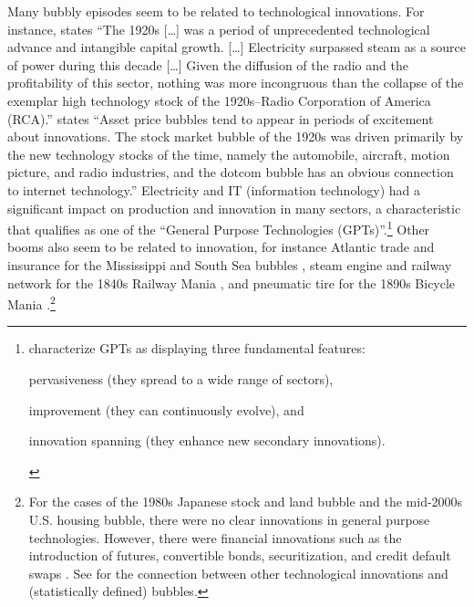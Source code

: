 \documentclass[a4paper,12pt]{article}
\numberwithin{equation}{section}
\theoremstyle{plain}
\begin{document}
Many bubbly episodes seem to be related to technological innovations. For instance, \citet[p.~1372]{Nicholas2008} states ``The 1920s [\ldots] was a period of unprecedented technological advance and intangible capital growth. [\ldots] Electricity
surpassed steam as a source of power during this decade [\ldots] Given the diffusion of the radio and the profitability of this sector, nothing was more incongruous than the collapse of the exemplar high technology stock of the 1920s--Radio Corporation
of America (RCA).'' \citet[p.~22]{Scheinkman2014} states ``Asset price bubbles tend to appear in periods of excitement about innovations. The stock market bubble of the 1920s was driven primarily by the
new technology stocks of the time, namely the automobile, aircraft, motion
picture, and radio industries, and the dotcom bubble has an obvious connection to internet technology.'' Electricity and IT (information technology) had a significant impact on production and innovation in many sectors, a characteristic that qualifies as one of the ``General Purpose Technologies (GPTs)''.\footnote{\citet{BresnahanTrajtenberg1995} characterize GPTs as displaying three fundamental features:
\begin{enumerate*}
    \item pervasiveness (they spread to a wide range of sectors),
    \item improvement (they can continuously evolve), and
    \item innovation spanning (they enhance new secondary innovations).
\end{enumerate*}}
Other booms also seem to be related to innovation, for instance Atlantic trade and insurance for the Mississippi and South Sea bubbles \citep*{FrehenGoetzmannRouwenhorst2013}, steam engine and railway network for the 1840s Railway Mania \citep[Ch.~4]{QuinnTurner2020}, and pneumatic tire for the 1890s Bicycle Mania \citep[Ch.~6]{QuinnTurner2020}.\footnote{For the cases of the 1980s Japanese stock and land bubble and the mid-2000s U.S. housing bubble, there were no clear innovations in general purpose technologies. However, there were financial innovations such as the introduction of futures, convertible bonds, securitization, and credit default swaps \citep{FostelGeanakoplos2012Tranching,HiranoToda2024JME}. See \citet{SorescuSorescuArmstrongDevoldere2018} for the connection between other technological innovations and (statistically defined) bubbles.}
\end{document}
